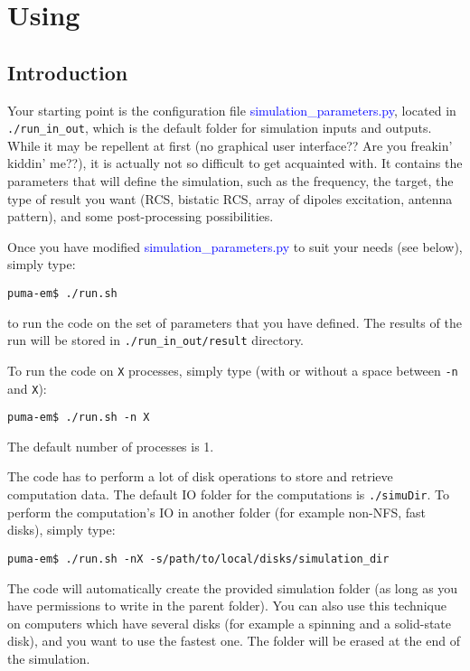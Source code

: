 \documentclass[a4paper,10pt]{book}
\newcommand{\file}[1] {\textcolor{blue}{\textsf{#1}}}
\begin{document}
\chapter{Using}

\section{Introduction}
\label{sec:Introduction}
%
\par
Your starting point is the configuration file \file{simulation\_parameters.py}, located in \texttt{./run\_in\_out}, which is the default folder for simulation inputs and outputs. While it may be repellent at first (no graphical user interface?? Are you freakin' kiddin' me??), it is actually not so difficult to get acquainted with. It contains the parameters that will define the simulation, such as the frequency, the target, the type of result you want (RCS, bistatic RCS, array of dipoles excitation, antenna pattern), and some post-processing possibilities. 
%
\par
Once you have modified \file{simulation\_parameters.py} to suit your needs (see below), simply type:
\begin{verbatim}
puma-em$ ./run.sh
\end{verbatim}
to run the code on the set of parameters that you have defined. The results of the run will be stored in \texttt{./run\_in\_out/result} directory.
%
\par
To run the code on \texttt{X} processes, simply type (with or without a space between \texttt{-n} and \texttt{X}):
\begin{verbatim}
puma-em$ ./run.sh -n X
\end{verbatim}
%
The default number of processes is 1.
\par
The code has to perform a lot of disk operations to store and retrieve computation data. The default IO folder for the computations is \texttt{./simuDir}. To perform the computation's IO in another folder (for example non-NFS, fast disks), simply type:
\begin{verbatim}
puma-em$ ./run.sh -nX -s/path/to/local/disks/simulation_dir 
\end{verbatim}
The code will automatically create the provided simulation folder (as long as you have permissions to write in the parent folder). You can also use this technique on computers which have several disks (for example a spinning and a solid-state disk), and you want to use the fastest one. The folder will be erased at the end of the simulation.
\end{document}
